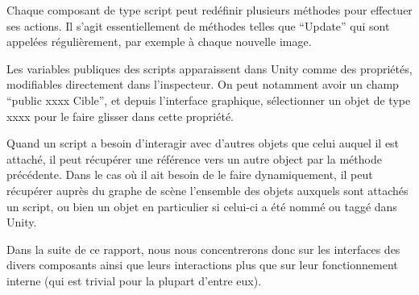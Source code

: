 Chaque composant de type script peut redéfinir plusieurs méthodes pour effectuer ses actions. Il s'agit essentiellement de méthodes telles que \enquote{Update} qui sont appelées régulièrement, par exemple à chaque nouvelle image.\newline

Les variables publiques des scripts apparaissent dans Unity comme des propriétés, modifiables directement dans l'inspecteur. On peut notamment avoir un champ \enquote{public xxxx Cible}, et depuis l'interface graphique, sélectionner un objet de type xxxx pour le faire glisser dans cette propriété.\newline

Quand un script a besoin d'interagir avec d'autres objets que celui auquel il est attaché, il peut récupérer une référence vers un autre  object par la méthode précédente. Dans le cas où il ait besoin de le faire dynamiquement, il peut récupérer auprès du graphe de scène l'ensemble des objets auxquels sont attachés un script, ou bien un objet en particulier si celui-ci a été nommé ou taggé dans Unity.\newline

Dans la suite de ce rapport, nous nous concentrerons donc sur les interfaces des divers composants ainsi que leurs interactions plus que sur leur fonctionnement interne (qui est trivial pour la plupart d'entre eux).\newline
